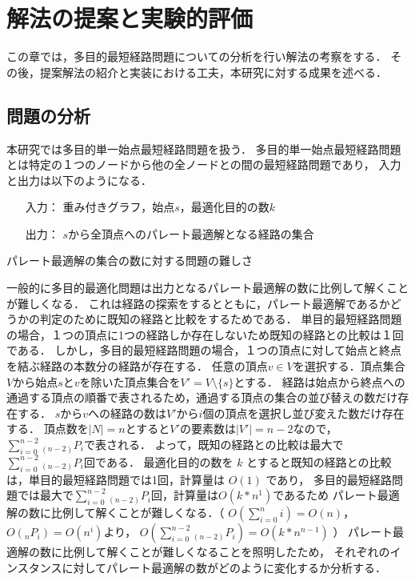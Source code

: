 \documentclass[12pt]{optlab-bachelor}
\begin{document}
\chapter{解法の提案と実験的評価}
この章では，多目的最短経路問題についての分析を行い解法の考察をする．
その後，提案解法の紹介と実装における工夫，本研究に対する成果を述べる．

\section{問題の分析}
本研究では多目的単一始点最短経路問題を扱う．
多目的単一始点最短経路問題とは特定の１つのノードから他の全ノードとの間の最短経路問題であり，
入力と出力は以下のようになる．
\begin{itemize}
  \item[入力：]重み付きグラフ，始点$s$，最適化目的の数$k$
  \item[出力：]$s$から全頂点へのパレート最適解となる経路の集合
\end{itemize}

\begin{description}
  \item[パレート最適解の集合の数に対する問題の難しさ]
\end{description}

一般的に多目的最適化問題は出力となるパレート最適解の数に比例して解くことが難しくなる．
これは経路の探索をするとともに，パレート最適解であるかどうかの判定のために既知の経路と比較をするためである．
単目的最短経路問題の場合，１つの頂点に1つの経路しか存在しないため既知の経路との比較は１回である．
しかし，多目的最短経路問題の場合，１つの頂点に対して始点と終点を結ぶ経路の本数分の経路が存在する．
任意の頂点$v \in V$を選択する．頂点集合$V$から始点$s$と$v$を除いた頂点集合を$V'=V \setminus \{s\}$とする．
経路は始点から終点への通過する頂点の順番で表されるため，通過する頂点の集合の並び替えの数だけ存在する．
$s$から$v$への経路の数は$V'$から$i$個の頂点を選択し並び変えた数だけ存在する．
頂点数を$|N|=n$とすると$V'$の要素数は$|V'|=n-2$なので，
$\displaystyle \sum_{i=0}^{n-2} {}_{(n-2)}P_i$で表される．
よって，既知の経路との比較は最大で$\displaystyle \sum_{i=0}^{n-2} {}_{(n-2)}P_i$回である．
最適化目的の数を $k$ とすると既知の経路との比較は，単目的最短経路問題では1回，計算量は $O(1)$ であり，
多目的最短経路問題では最大で$\displaystyle \sum_{i=0}^{n-2} {}_{(n-2)}P_i$回，計算量は$O(k*n^1)$であるため
パレート最適解の数に比例して解くことが難しくなる．（  $O(\displaystyle \sum_{i=0}^{n} i)=O(n)$，$O({}_nP_i)=O(n^i)$より，
$O(\displaystyle \sum_{i=0}^{n-2} {}_{(n-2)}P_i)=O(k*n^{n-1})$ ）
パレート最適解の数に比例して解くことが難しくなることを照明したため，
それぞれのインスタンスに対してパレート最適解の数がどのように変化するか分析する．
\end{document}
